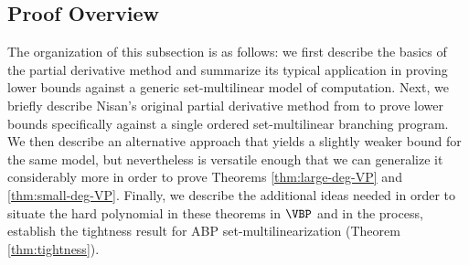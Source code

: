 \documentclass{article}
\begin{document}


\subsection{Proof Overview}\label{subsec:overview}

The organization of this subsection is as follows: we first describe the basics of the partial derivative method and summarize its typical application in proving lower bounds against a generic set-multilinear model of computation. Next, we briefly describe Nisan's original partial derivative method from \cite{Nisan91} to prove lower bounds specifically against a single ordered set-multilinear branching program. We then describe an alternative approach that yields a slightly weaker bound for the same model, but nevertheless is versatile enough that we can generalize it considerably more in order to prove Theorems \ref{thm:large-deg-VP} and \ref{thm:small-deg-VP}. Finally, we describe the additional ideas needed in order to situate the hard polynomial in these theorems in $\VBP$ and in the process, establish the tightness result for ABP set-multilinearization (Theorem \ref{thm:tightness}).

\end{document}

